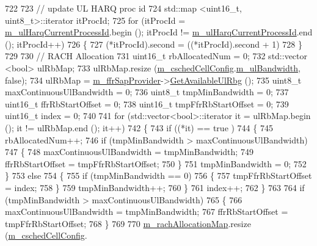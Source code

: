 \begin{DoxyCode}
722 
723   \textcolor{comment}{//   update UL HARQ proc id}
724   std::map <uint16\_t, uint8\_t>::iterator itProcId;
725   \textcolor{keywordflow}{for} (itProcId = \hyperlink{classns3_1_1FdTbfqFfMacScheduler_a36b22976070611aa3fdd5c573f891dc2}{m\_ulHarqCurrentProcessId}.begin (); itProcId != 
      \hyperlink{classns3_1_1FdTbfqFfMacScheduler_a36b22976070611aa3fdd5c573f891dc2}{m\_ulHarqCurrentProcessId}.end (); itProcId++)
726     \{
727       (*itProcId).second = ((*itProcId).second + 1) %
728     \}
729 
730   \textcolor{comment}{// RACH Allocation}
731   uint16\_t rbAllocatedNum = 0;
732   std::vector <bool> ulRbMap;
733   ulRbMap.resize (\hyperlink{classns3_1_1FdTbfqFfMacScheduler_a73d5d866713fa06e1cc6186b0f556693}{m\_cschedCellConfig}.\hyperlink{structns3_1_1FfMacCschedSapProvider_1_1CschedCellConfigReqParameters_a5ab5b102878e6e7e7727a14af4a64d2f}{m\_ulBandwidth}, \textcolor{keyword}{false});
734   ulRbMap = \hyperlink{classns3_1_1FdTbfqFfMacScheduler_a15bcdfbb46c65cae0d42e26b321f7827}{m\_ffrSapProvider}->\hyperlink{classns3_1_1LteFfrSapProvider_aafd23b22a27ec83e03d54795c122d175}{GetAvailableUlRbg} ();
735   uint8\_t maxContinuousUlBandwidth = 0;
736   uint8\_t tmpMinBandwidth = 0;
737   uint16\_t ffrRbStartOffset = 0;
738   uint16\_t tmpFfrRbStartOffset = 0;
739   uint16\_t index = 0;
740 
741   \textcolor{keywordflow}{for} (std::vector<bool>::iterator it = ulRbMap.begin (); it != ulRbMap.end (); it++)
742     \{
743       \textcolor{keywordflow}{if} ((*it) == true )
744         \{
745           rbAllocatedNum++;
746           \textcolor{keywordflow}{if} (tmpMinBandwidth > maxContinuousUlBandwidth)
747             \{
748               maxContinuousUlBandwidth = tmpMinBandwidth;
749               ffrRbStartOffset = tmpFfrRbStartOffset;
750             \}
751           tmpMinBandwidth = 0;
752         \}
753       \textcolor{keywordflow}{else}
754         \{
755           \textcolor{keywordflow}{if} (tmpMinBandwidth == 0)
756             \{
757               tmpFfrRbStartOffset = index;
758             \}
759           tmpMinBandwidth++;
760         \}
761       index++;
762     \}
763 
764   \textcolor{keywordflow}{if} (tmpMinBandwidth > maxContinuousUlBandwidth)
765     \{
766       maxContinuousUlBandwidth = tmpMinBandwidth;
767       ffrRbStartOffset = tmpFfrRbStartOffset;
768     \}
769 
770   \hyperlink{classns3_1_1FdTbfqFfMacScheduler_a046aaad84777461862179b30893e38ec}{m\_rachAllocationMap}.resize (\hyperlink{classns3_1_1FdTbfqFfMacScheduler_a73d5d866713fa06e1cc6186b0f556693}{m\_cschedCellConfig}.

\end{DoxyCode}
